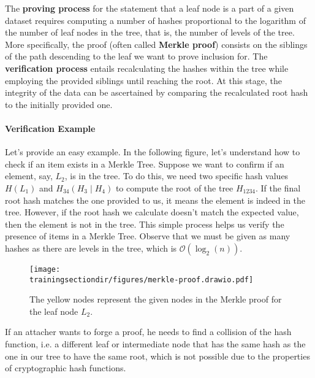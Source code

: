 The \textbf{proving process} for the statement that a leaf node is a part of a given dataset requires computing a number of hashes proportional to the logarithm of the number of leaf nodes in the tree, that is, the number of levels of the tree. More specifically, the proof (often called \textbf{Merkle proof}) consists on the siblings of the path descending to the leaf we want to prove inclusion for. The \textbf{verification process} entails recalculating the hashes within the tree while employing the provided siblings until reaching the root. At this stage, the integrity of the data can be ascertained by comparing the recalculated root hash to the initially provided one.

\paragraph*{Verification Example}

Let's provide an easy example. In the following figure, let's understand how to check if an item exists in a Merkle Tree. Suppose we want to confirm if an element, say, $L_{2}$, is in the tree. To do this, we need two specific hash values $H(L_1)$ and $H_{34}(H_3 \mid H_4)$ to compute the root of the tree $H_{1234}$. If the final root hash matches the one provided to us, it means the element is indeed in the tree. However, if the root hash we calculate doesn't match the expected value, then the element is not in the tree. This simple process helps us verify the presence of items in a Merkle Tree. Observe that we must be given as many hashes as there are levels in the tree, which is  $\mathcal{O}(\log_2(n))$.

\begin{figure}[H]
\centering
\texttt{[image: \\trainingsectiondir/figures/merkle-proof.drawio.pdf]}
\caption{The yellow nodes represent the given nodes in the Merkle proof for the leaf node $L_2$.}
\label{fig:merkle-proof}
\end{figure}

If an attacher wants to forge a proof, he needs to find a collision of the hash function, i.e. a different leaf or intermediate node that has the same hash as the one in our tree to have the same root, which is not possible due to the properties of cryptographic hash functions.








